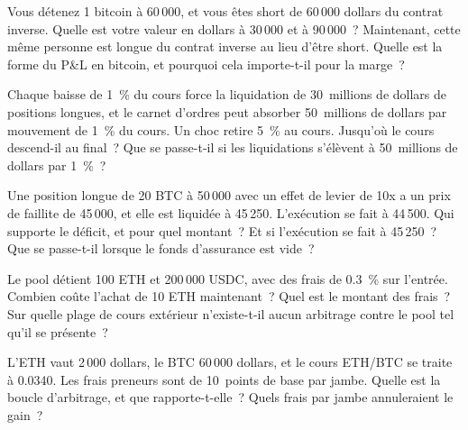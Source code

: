 \begin{question}\label{iq:iv2:crypto-for-traders-and-researchers:11}
Vous détenez 1 bitcoin à 60\,000, et vous êtes short de 60\,000 dollars du contrat inverse. Quelle est votre valeur en dollars à 30\,000 et à 90\,000~? Maintenant, cette même personne est longue du contrat inverse au lieu d'être short. Quelle est la forme du P\&L en bitcoin, et pourquoi cela importe-t-il pour la marge~?
\end{question}

\begin{question}\label{iq:iv2:crypto-for-traders-and-researchers:12}
Chaque baisse de 1~\% du cours force la liquidation de 30~millions de dollars de positions longues, et le carnet d'ordres peut absorber 50~millions de dollars par mouvement de 1~\% du cours. Un choc retire 5~\% au cours. Jusqu'où le cours descend-il au final~? Que se passe-t-il si les liquidations s'élèvent à 50~millions de dollars par 1~\%~?
\end{question}

\begin{question}\label{iq:iv2:crypto-for-traders-and-researchers:13}
Une position longue de 20 BTC à 50\,000 avec un effet de levier de 10x a un prix de faillite de 45\,000, et elle est liquidée à 45\,250. L'exécution se fait à 44\,500. Qui supporte le déficit, et pour quel montant~? Et si l'exécution se fait à 45\,250~? Que se passe-t-il lorsque le fonds d'assurance est vide~?
\end{question}

\begin{question}\label{iq:iv2:crypto-for-traders-and-researchers:14}
Le pool détient 100 ETH et 200\,000 USDC, avec des frais de 0.3~\% sur l'entrée. Combien coûte l'achat de 10 ETH maintenant~? Quel est le montant des frais~? Sur quelle plage de cours extérieur n'existe-t-il aucun arbitrage contre le pool tel qu'il se présente~?
\end{question}

\begin{question}\label{iq:iv2:crypto-for-traders-and-researchers:15}
L'ETH vaut 2\,000 dollars, le BTC 60\,000 dollars, et le cours ETH/BTC se traite à 0.0340. Les frais preneurs sont de 10~points de base par jambe. Quelle est la boucle d'arbitrage, et que rapporte-t-elle~? Quels frais par jambe annuleraient le gain~?
\end{question}

